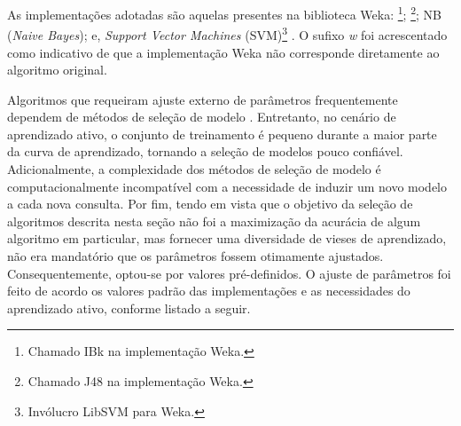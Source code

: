 As implementações adotadas são aquelas presentes na biblioteca Weka:
\footnote{Chamado IBk na implementação Weka.};
\footnote{Chamado J48 na implementação Weka.};
NB (\textit{Naive Bayes}); e,
\textit{Support Vector Machines} (SVM)\footnote{Invólucro LibSVM para Weka.}
\cite{journals/tit/Hart68,
books/mk/Quinlan93,
conf/ecml/Lewis98,
hearst1998support}.
O sufixo \textit{w} foi acrescentado como indicativo de que a implementação Weka não corresponde diretamente ao algoritmo original.

Algoritmos que requeiram ajuste externo de parâmetros frequentemente dependem de métodos de seleção de modelo \cite{arlot2010survey}.
Entretanto, no cenário de aprendizado ativo, o conjunto de treinamento é pequeno durante a maior parte da curva de aprendizado, tornando a seleção de modelos pouco confiável.
Adicionalmente, a complexidade dos métodos de seleção de modelo é computacionalmente incompatível com a necessidade de induzir um novo modelo a cada nova consulta.
Por fim, tendo em vista que o objetivo da seleção de algoritmos descrita nesta seção não foi a maximização da acurácia de algum algoritmo em particular, mas fornecer uma diversidade de vieses de aprendizado, não era mandatório que os parâmetros fossem otimamente ajustados.
Consequentemente, optou-se por valores pré-definidos.
O ajuste de parâmetros foi feito de acordo os valores padrão das implementações e as necessidades do aprendizado ativo, conforme listado a seguir.
